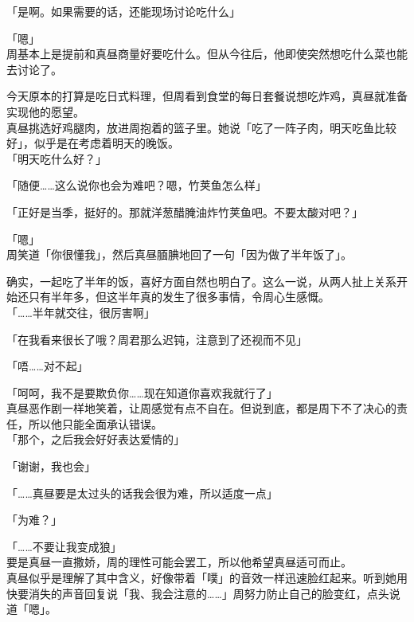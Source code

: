 「是啊。如果需要的话，还能现场讨论吃什么」

「嗯」\\

周基本上是提前和真昼商量好要吃什么。但从今往后，他即使突然想吃什么菜也能去讨论了。

今天原本的打算是吃日式料理，但周看到食堂的每日套餐说想吃炸鸡，真昼就准备实现他的愿望。\\

真昼挑选好鸡腿肉，放进周抱着的篮子里。她说「吃了一阵子肉，明天吃鱼比较好」，似乎是在考虑着明天的晚饭。\\

「明天吃什么好？」

「随便……这么说你也会为难吧？嗯，竹荚鱼怎么样」

「正好是当季，挺好的。那就洋葱醋腌油炸竹荚鱼吧。不要太酸对吧？」

「嗯」\\

周笑道「你很懂我」，然后真昼腼腆地回了一句「因为做了半年饭了」。

确实，一起吃了半年的饭，喜好方面自然也明白了。这么一说，从两人扯上关系开始还只有半年多，但这半年真的发生了很多事情，令周心生感慨。\\

「……半年就交往，很厉害啊」

「在我看来很长了哦？周君那么迟钝，注意到了还视而不见」

「唔……对不起」

「呵呵，我不是要欺负你……现在知道你喜欢我就行了」\\

真昼恶作剧一样地笑着，让周感觉有点不自在。但说到底，都是周下不了决心的责任，所以他只能全面承认错误。\\

「那个，之后我会好好表达爱情的」

「谢谢，我也会」

「……真昼要是太过头的话我会很为难，所以适度一点」

「为难？」

「……不要让我变成狼」\\

要是真昼一直撒娇，周的理性可能会罢工，所以他希望真昼适可而止。\\

真昼似乎是理解了其中含义，好像带着「噗」的音效一样迅速脸红起来。听到她用快要消失的声音回复说「我、我会注意的……」周努力防止自己的脸变红，点头说道「嗯」。
